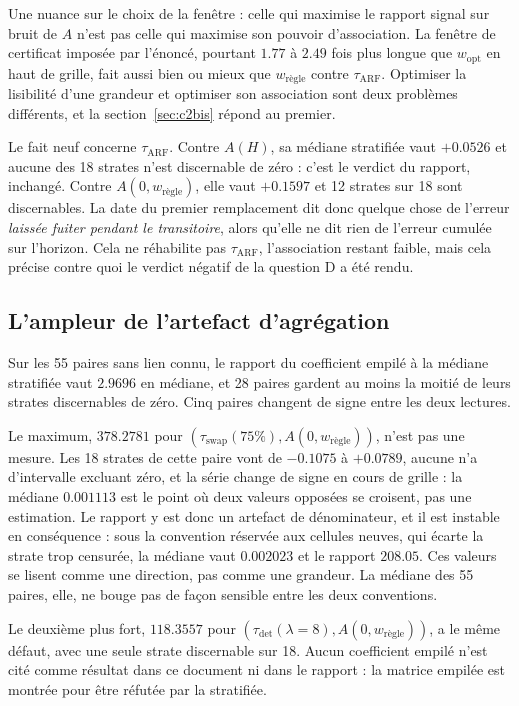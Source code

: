 \documentclass[11pt,a4paper]{article}
\begin{document}
Une nuance sur le choix de la fenêtre : celle qui maximise le rapport signal sur bruit de $A$
n'est pas celle qui maximise son pouvoir d'association. La fenêtre de certificat imposée par
l'énoncé, pourtant $1.77$ à $2.49$ fois plus longue que $w_{\mathrm{opt}}$ en haut de grille,
fait aussi bien ou mieux que $w_{\text{règle}}$ contre $\tau_{\mathrm{ARF}}$. Optimiser la
lisibilité d'une grandeur et optimiser son association sont deux problèmes différents, et la
section~\ref{sec:c2bis} répond au premier.

Le fait neuf concerne $\tau_{\mathrm{ARF}}$. Contre $A(H)$, sa médiane stratifiée vaut
$+0.0526$ et aucune des 18 strates n'est discernable de zéro : c'est le verdict du rapport,
inchangé. Contre $A(0,w_{\text{règle}})$, elle vaut $+0.1597$ et 12 strates sur 18 sont
discernables. La date du premier remplacement dit donc quelque chose de l'erreur
\emph{laissée fuiter pendant le transitoire}, alors qu'elle ne dit rien de l'erreur cumulée
sur l'horizon. Cela ne réhabilite pas $\tau_{\mathrm{ARF}}$, l'association restant faible,
mais cela précise contre quoi le verdict négatif de la question D a été rendu.

\subsection{L'ampleur de l'artefact d'agrégation}

Sur les 55 paires sans lien connu, le rapport du coefficient empilé à la médiane stratifiée
vaut $2.9696$ en médiane, et 28 paires gardent au moins la moitié de leurs strates
discernables de zéro. Cinq paires changent de signe entre les deux lectures.

Le maximum, $378.2781$ pour $(\tau_{\mathrm{swap}}(75\%), A(0,w_{\text{règle}}))$, n'est pas
une mesure. Les 18 strates de cette paire vont de $-0.1075$ à $+0.0789$, aucune n'a
d'intervalle excluant zéro, et la série change de signe en cours de grille : la médiane
$0.001113$ est le point où deux valeurs opposées se croisent, pas une estimation. Le rapport
y est donc un artefact de dénominateur, et il est instable en conséquence : sous la
convention réservée aux cellules neuves, qui écarte la strate trop censurée, la médiane vaut
$0.002023$ et le rapport $208.05$. Ces valeurs se lisent comme une direction, pas comme une
grandeur. La médiane des 55 paires, elle, ne bouge pas de façon sensible entre les deux
conventions.

Le deuxième plus fort, $118.3557$ pour
$(\tau_{\mathrm{det}}(\lambda = 8), A(0,w_{\text{règle}}))$, a le même défaut, avec une seule
strate discernable sur 18. Aucun coefficient empilé n'est cité comme résultat dans ce
document ni dans le rapport : la matrice empilée est montrée pour être réfutée par la
stratifiée.
\end{document}
